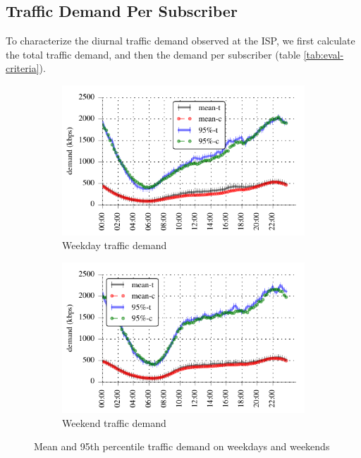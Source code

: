 \subsection{Traffic Demand Per Subscriber}\label{subsec:behavior}

To characterize the diurnal traffic demand observed at the ISP, we first 
calculate the total traffic demand, and then the demand per subscriber
(table \ref{tab:eval-criteria}).

\begin{figure}[t]
\begin{minipage}{1\linewidth}
\centering
%
\begin{subfigure}[b]{0.49\linewidth}
\includegraphics[width=\linewidth]{figures/weekday_demand_mean_perc95.pdf}
               \caption{Weekday traffic demand\label{fig:weekday-daily-usage}}
\end{subfigure}
%
\begin{subfigure}[b]{0.49\linewidth}
\includegraphics[width=\linewidth]{figures/weekend_demand_mean_perc95}
               \caption{Weekend traffic demand\label{fig:weekend-daily-usage}}
\end{subfigure}
%
\end{minipage}
\caption{Mean and 95th percentile traffic demand on weekdays and weekends}
\label{fig:traffic-demand-timeseries}
\end{figure}

